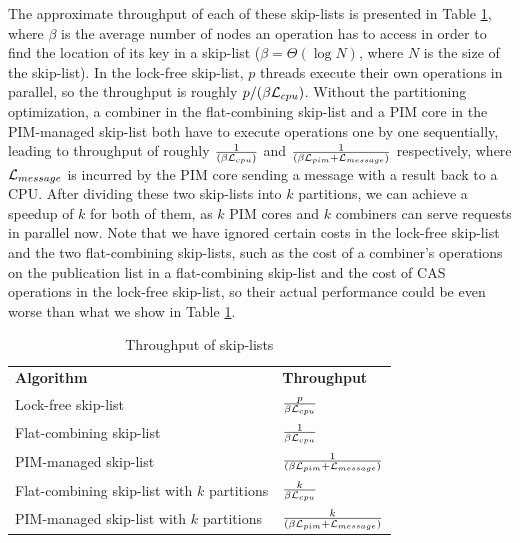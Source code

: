 The approximate throughput of each of these skip-lists is presented in
Table \ref{tab:skiplist}, where $\beta$ is the average number of nodes
an operation has to access in order to find the location of its key in
a skip-list ($\beta = \Theta(\log N)$, where $N$ is the size of the
skip-list).  In the lock-free skip-list, $p$ threads execute their own
operations in parallel, so the throughput is roughly
$p/(\beta\mathcal{L}_{cpu})$.  Without the partitioning optimization, a combiner
in the flat-combining skip-list and a PIM core in the PIM-managed
skip-list both have to execute operations one by one sequentially,
leading to throughput of roughly ${1 \over (\beta\mathcal{L}_{cpu})}$ and ${1
  \over (\beta\mathcal{L}_{pim} + \mathcal{L}_{message})}$ respectively, where $\mathcal{L}_{message}$ is
incurred by the PIM core sending a message with a result back to a
CPU.  After dividing these two skip-lists into $k$ partitions, we can
achieve a speedup of $k$ for both of them, as $k$ PIM cores and $k$
combiners can serve requests in parallel now.  Note that we have
ignored certain costs in the lock-free skip-list and the two
flat-combining skip-lists, such as the cost of a combiner's operations
on the publication list in a flat-combining skip-list and the cost of
CAS operations in the lock-free skip-list, so their actual performance
could be even worse than what we show in Table \ref{tab:skiplist}.

\begin{table}[ht!]
\begin{center}
	\begin{tabular}{| >{\small}l | l |}
    \hline
    \textbf{Algorithm} & \textbf{Throughput} \\ \hhline{|=|=|} 
    Lock-free skip-list & ${p \over \beta\mathcal{L}_{cpu}}$ \\ \hline
    Flat-combining skip-list & ${1 \over \beta\mathcal{L}_{cpu}}$ \\ \hline
    PIM-managed skip-list & ${1 \over (\beta\mathcal{L}_{pim} + \mathcal{L}_{message})}$ \\ \hline
    Flat-combining skip-list with $k$ partitions & ${k \over \beta\mathcal{L}_{cpu}}$ \\ \hline
    PIM-managed skip-list with $k$ partitions & ${k \over (\beta\mathcal{L}_{pim} + \mathcal{L}_{message})}$ \\ \hline
    \end{tabular}
\end{center}
\caption{Throughput of skip-lists}
\label{tab:skiplist}
\end{table}

